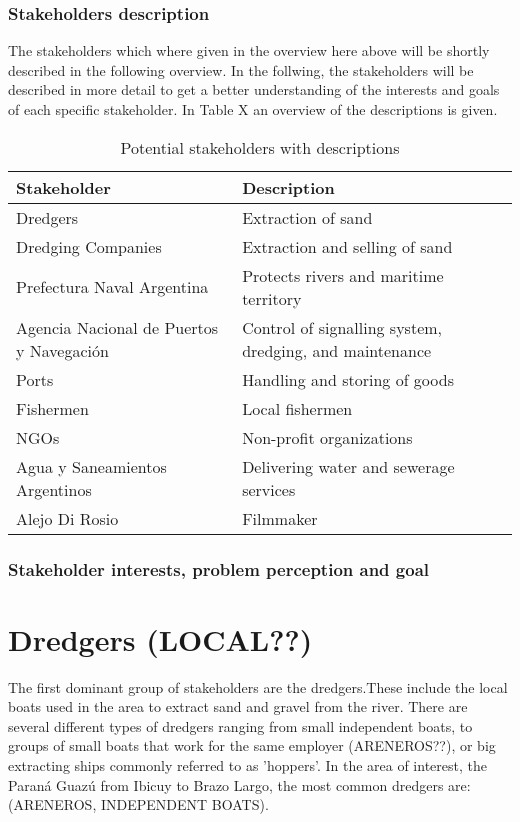 \subsubsection{Stakeholders description}

The stakeholders which where given in the overview here above will be shortly described in the following overview. In the follwing, the stakeholders will be described in more detail to get a better understanding of the interests and goals of each specific stakeholder. In Table X an overview of the descriptions is given.

\begin{table}[ht]
\centering
\begin{tabularx}{\linewidth}{lX}
\toprule
\textbf{Stakeholder} & \textbf{Description} \\
\midrule
Dredgers & Extraction of sand \\
\midrule
Dredging Companies & Extraction and selling of sand \\
\midrule
Prefectura Naval Argentina & Protects rivers and maritime territory \\
\midrule
Agencia Nacional de Puertos y Navegación & Control of signalling system, dredging, and maintenance \\
\midrule
Ports & Handling and storing of goods \\
\midrule
Fishermen & Local fishermen \\
\midrule
NGOs & Non-profit organizations \\
\midrule
Agua y Saneamientos Argentinos & Delivering water and sewerage services \\
\midrule
Alejo Di Rosio & Filmmaker \\
\bottomrule
\end{tabularx}
\caption{Potential stakeholders with descriptions}
\label{tab:stakeholders-description}
\end{table}




\subsubsection{Stakeholder interests, problem perception and goal}



\section{Dredgers (LOCAL??)}
The first dominant group of stakeholders are the dredgers.These include the local boats used in the area to extract sand and gravel from the river. There are several different types of dredgers ranging from small independent boats, to groups of small boats that work for the same employer (ARENEROS??), or big extracting ships commonly referred to as 'hoppers'. In the area of interest, the Paraná Guazú from Ibicuy to Brazo Largo, the most common dredgers are: (ARENEROS, INDEPENDENT BOATS). 


